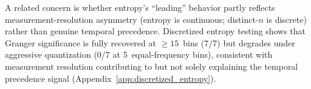 A related concern is whether entropy's ``leading'' behavior partly reflects measurement-resolution asymmetry (entropy is continuous; distinct-$n$ is discrete) rather than genuine temporal precedence.
Discretized entropy testing shows that Granger significance is fully recovered at ${\geq}15$~bins (7/7) but degrades under aggressive quantization (0/7 at 5~equal-frequency bins), consistent with measurement resolution contributing to but not solely explaining the temporal precedence signal (Appendix~\ref{app:discretized_entropy}).
